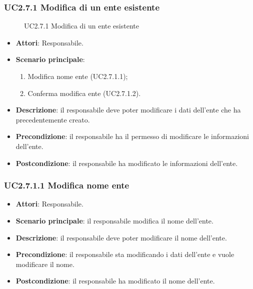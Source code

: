 \subsubsection{UC2.7.1 Modifica di un ente esistente}
\begin{figure}[H]
\centering
\noindent{}
\caption{UC2.7.1 Modifica di un ente esistente}
\end{figure}
\begin{itemize}
\item \textbf{Attori}: Responsabile.
\item \textbf{Scenario principale}:
\begin{enumerate}
\item Modifica nome ente (UC2.7.1.1);
\item Conferma modifica ente (UC2.7.1.2).
\end{enumerate}
\item \textbf{Descrizione}: il responsabile deve poter modificare i dati dell’ente che ha precedentemente creato.
\item \textbf{Precondizione}: il responsabile ha il permesso di modificare le informazioni dell’ente.
\item \textbf{Postcondizione}: il responsabile ha modificato le informazioni dell’ente.
\end{itemize}
\subsubsection{UC2.7.1.1 Modifica nome ente}
\begin{itemize}
\item \textbf{Attori}: Responsabile.
\item \textbf{Scenario principale}: il responsabile modifica il nome dell'ente.
\item \textbf{Descrizione}: il responsabile deve poter modificare il nome dell'ente.
\item \textbf{Precondizione}: il responsabile sta modificando i dati dell'ente e vuole modificare il nome.
\item \textbf{Postcondizione}: il responsabile ha modificato il nome dell'ente.
\end{itemize}

